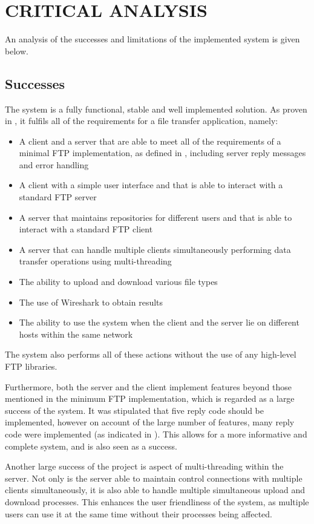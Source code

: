 \documentclass[10pt,twocolumn]{witseiepaper}
\begin{document}
\section{CRITICAL ANALYSIS}
An analysis of the successes and limitations of the implemented system is given below.

\subsection{Successes}
The system is a fully functional, stable and well implemented solution. As proven in , it fulfils all of the requirements for a file transfer application, namely:
\begin{itemize}
	\item A client and a server that are able to meet all of the requirements of a minimal FTP implementation, as defined in \cite{rfc}, including server reply messages and error handling
	\item A client with a simple user interface and that is able to interact with a standard FTP server
	\item A server that maintains repositories for different users and that is able to interact with a standard FTP client
	\item A server that can handle multiple clients simultaneously performing data transfer operations using multi-threading
	\item The ability to upload and download various file types
	\item The use of Wireshark to obtain results
	\item The ability to use the system when the client and the server lie on different hosts within the same network
	
\end{itemize}

The system also performs all of these actions without the use of any high-level FTP libraries. 

Furthermore, both the server and the client implement features beyond those mentioned in the minimum FTP implementation, which is regarded as a large success of the system. It was stipulated that five reply code should be implemented, however on account of the large number of features, many reply code were implemented (as indicated in ). This allows for a more informative and complete system, and is also seen as a success.

Another large success of the project is aspect of multi-threading within the server. Not only is the server able to maintain control connections with multiple clients simultaneously, it is also able to handle multiple simultaneous upload and download processes. This enhances the user friendliness of the system, as multiple users can use it at the same time without their processes being affected.
\end{document}
